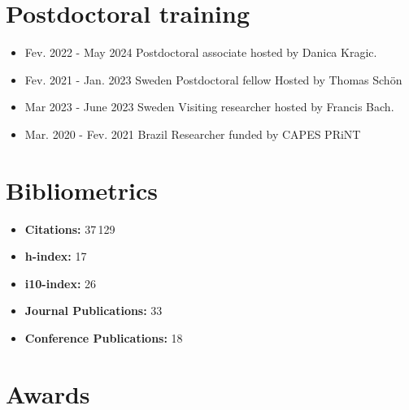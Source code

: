 \documentclass[10pt,A4]{article} %
\begin{document}
\section{Postdoctoral training} %

\begin{itemize}

    \item {}
    { Fev. 2022 -   May 2024  }
    {   }{}{} Postdoctoral associate hosted by Danica Kragic.

    \item {}
    { Fev. 2021 -   Jan. 2023  }
    { Sweden  }{}{} Postdoctoral fellow Hosted by Thomas Schön

    \item {}
    { Mar 2023 -   June 2023  }
    { Sweden  }{}{} Visiting researcher hosted by Francis Bach.

    \item {}
    { Mar. 2020 -   Fev. 2021  }
    { Brazil  }{}{} Researcher funded by CAPES PRiNT

\end{itemize}


\section{Bibliometrics}
\begin{itemize}
\item \textbf{Citations:} 37\,129
 \item \textbf{h-index:} 17
 \item \textbf{i10-index:} 26
 \item \textbf{Journal Publications:} 33
\item \textbf{Conference Publications:} 18
\end{itemize}
  

\section{Awards}
\end{document}
